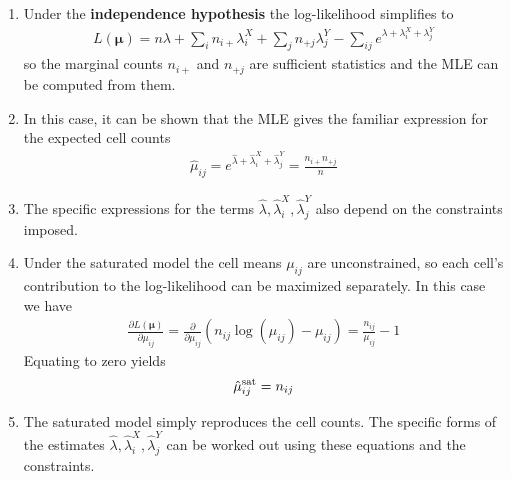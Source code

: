 \documentclass[11pt]{elegantbook}
\begin{document}
\begin{enumerate}[$\bullet$]
    \item Under the \textbf{independence hypothesis} the log-likelihood simplifies to
    \begin{equation}
        \begin{aligned}
            L(\boldsymbol{\mu})=n\lambda + \sum_{i}n_{i+}\lambda_i^X+\sum_j n_{+j}\lambda_j^Y -\sum_{ij}e^{\lambda+\lambda_i^X+\lambda_j^Y}
        \end{aligned}
        \nonumber
    \end{equation}
    so the marginal counts $n_{i+}$ and $n_{+j}$ are sufficient statistics and the MLE can be computed from them.
    \item In this case, it can be shown that the MLE gives the familiar expression for the expected cell counts
    \begin{equation}
        \begin{aligned}
            \hat{\mu}_{ij}=e^{\hat{\lambda}+\hat{\lambda}_i^X+\hat{\lambda}_j^Y}=\frac{n_{i+}n_{+j}}{n}
        \end{aligned}
        \nonumber
    \end{equation}
    \item The specific expressions for the terms $\hat{\lambda},\hat{\lambda}_i^X,\hat{\lambda}_j^Y$ also depend on the constraints imposed.
    \item Under the saturated model the cell means $\mu_{ij}$ are unconstrained, so each cell's contribution to the log-likelihood can be maximized separately. In this case we have
    \begin{equation}
        \begin{aligned}
            \frac{\partial L(\boldsymbol{\mu})}{\partial \mu_{ij}}=\frac{\partial}{\partial \mu_{ij}}\left(n_{ij}\log(\mu_{ij})-\mu_{ij}\right)=\frac{n_{ij}}{\mu_{ij}}-1
        \end{aligned}
        \nonumber
    \end{equation}
    Equating to zero yields $$\hat{\mu}^{\textnormal{sat}}_{ij}=n_{ij}$$
    \item The saturated model simply reproduces the cell counts. The specific forms of the estimates $\hat{\lambda},\hat{\lambda}_i^X,\hat{\lambda}_j^Y$ can be worked out using these equations and the constraints.
\end{enumerate}
\end{document}

